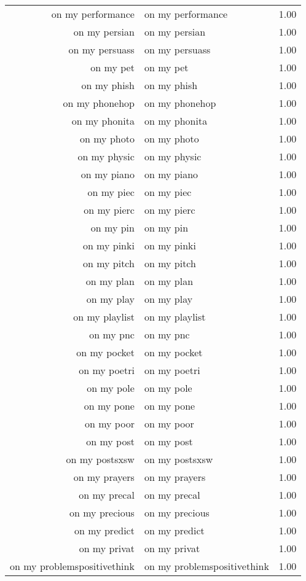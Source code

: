 \begin{table}[ht]
\begin{tabular}{rlr}
  on my performance & on my performance & 1.00 \\ 
  on my persian & on my persian & 1.00 \\ 
  on my persuass & on my persuass & 1.00 \\ 
  on my pet & on my pet & 1.00 \\ 
  on my phish & on my phish & 1.00 \\ 
  on my phonehop & on my phonehop & 1.00 \\ 
  on my phonita & on my phonita & 1.00 \\ 
  on my photo & on my photo & 1.00 \\ 
  on my physic & on my physic & 1.00 \\ 
  on my piano & on my piano & 1.00 \\ 
  on my piec & on my piec & 1.00 \\ 
  on my pierc & on my pierc & 1.00 \\ 
  on my pin & on my pin & 1.00 \\ 
  on my pinki & on my pinki & 1.00 \\ 
  on my pitch & on my pitch & 1.00 \\ 
  on my plan & on my plan & 1.00 \\ 
  on my play & on my play & 1.00 \\ 
  on my playlist & on my playlist & 1.00 \\ 
  on my pnc & on my pnc & 1.00 \\ 
  on my pocket & on my pocket & 1.00 \\ 
  on my poetri & on my poetri & 1.00 \\ 
  on my pole & on my pole & 1.00 \\ 
  on my pone & on my pone & 1.00 \\ 
  on my poor & on my poor & 1.00 \\ 
  on my post & on my post & 1.00 \\ 
  on my postsxsw & on my postsxsw & 1.00 \\ 
  on my prayers & on my prayers & 1.00 \\ 
  on my precal & on my precal & 1.00 \\ 
  on my precious & on my precious & 1.00 \\ 
  on my predict & on my predict & 1.00 \\ 
  on my privat & on my privat & 1.00 \\ 
  on my problemspositivethink & on my problemspositivethink & 1.00 \\ 

\end{tabular}
\end{table}
